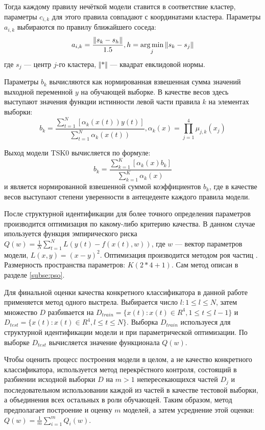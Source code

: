 Тогда каждому правилу нечёткой модели ставится в соответствие кластер, параметры \(c_{i,k}\)
для этого правила совпадают с координатами кластера. Параметры \(a_{i,k}\) выбираются
по правилу ближайшего соседа:
\begin{displaymath}
a_{i,k}=\frac{\Vert s_k-s_h\Vert}{1.5},h=\operatorname*{arg\,min}_{j}\Vert s_k-s_j\Vert
\end{displaymath}
где \(s_j\) --- центр \(j\)-го кластера, \(\Vert * \Vert\) --- квадрат евклидовой нормы.
\par
Параметры \(b_k\) вычисляются как нормированная взвешенная сумма значений выходной переменной \(y\)
на обучающей выборке. В качестве весов здесь выступают значения функции истинности левой части
правила \(k\) на элементах выборки:
\begin{displaymath}
  b_k=\frac{\sum_{t=1}^{N}[\alpha_k(x(t))y(t)]}{\sum_{t=1}^{N}\alpha_k(x(t))},
  \alpha_k(x)=\prod_{j=1}^{4}\mu_{j,k}(x_j)
\end{displaymath}
\par
Выход модели TSK0 вычисляется по формуле:
\begin{displaymath}
  b_k=\frac{\sum_{k=1}^{K}[\alpha_k(x)b_k]}{\sum_{k=1}^{K}\alpha_k(x)}
\end{displaymath}
и является нормированной взвешенной суммой коэффициентов \(b_k\), где в
качестве весов выступают степени уверенности в антецеденте каждого правила модели.
\par
После структурной идентификации для более точного определения параметров
производится оптимизация по какому-либо критерию качества. В данном
случае ипользуется функция эмпирического риска \(Q(w)=\frac{1}{N}\sum_{t=1}^{N}L(y(t)-f(x(t),w))\),
где \(w\) --- вектор параметров модели, \(L(x,y)=(x-y)^2\). Оптимизация производится
методом роя частиц \cite{pso}. Размерность пространства параметров: \(K(2*4 + 1)\).
Сам метод описан в разделе \ref{subse:pso}.
\par
Для финальной оценки качества конкретного классификатора в данной работе применяется
метод одного выстрела. Выбирается число \(l:1\leqslant l\leqslant N\),
затем множество \(D\) разбивается на \(D_{train} = \{x(t):x(t)\in R^4, 1 \leqslant t \leqslant l-1\}\)
и \(D_{test} = \{x(t):x(t)\in R^4, l \leqslant t \leqslant N\}\). Выборка \(D_{train}\)
используеся для структурной идентификации модели и при параметрической оптимизации.
По выборке \(D_{test}\) вычисляется значение функционала \(Q(w)\).
\par
Чтобы оценить процесс построения модели в целом, а не качество конкретного классификатора,
используется метод перекрёстного контроля, состоящий в разбиении исходной выборки
\(D\) на \(m>1\) непересекающихся частей \(D_j\) и последовательном использовании
каждой из частей в качестве тестовой выборки, а объединения всех остальных в роли
обучающей. Таким образом, метод предполагает построение и оценку \(m\) моделей, а
затем усреднение этой оценки: \(Q(w)=\frac{1}{m} \sum_{i=1}^{m}Q_i(w)\).

